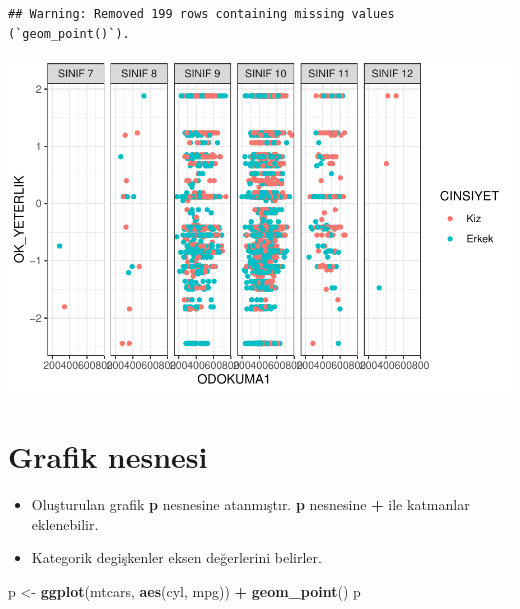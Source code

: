 \documentclass[
  oneside]{book}
\newenvironment{Shaded}{\begin{snugshade}}{\end{snugshade}}
\newcommand{\FunctionTok}[1]{\textcolor[rgb]{0.13,0.29,0.53}{\textbf{#1}}}
\newcommand{\NormalTok}[1]{#1}
\newcommand{\OtherTok}[1]{\textcolor[rgb]{0.56,0.35,0.01}{#1}}
\newcommand{\SpecialCharTok}[1]{\textcolor[rgb]{0.81,0.36,0.00}{\textbf{#1}}}
\providecommand{\tightlist}{%
  \setlength{\itemsep}{0pt}\setlength{\parskip}{0pt}}
\begin{document}
\begin{verbatim}
## Warning: Removed 199 rows containing missing values (`geom_point()`).
\end{verbatim}

\begin{center}\includegraphics[width=1\linewidth]{15-betimleyici-istatistik_files/figure-latex/unnamed-chunk-37-1} \end{center}

\hypertarget{grafik-nesnesi}{%
\section{Grafik nesnesi}\label{grafik-nesnesi}}

\begin{itemize}
\tightlist
\item
  Oluşturulan grafik \textbf{p} nesnesine atanmıştır. \textbf{p} nesnesine \textbf{+} ile katmanlar eklenebilir.
\item
  Kategorik degişkenler eksen değerlerini belirler.
\end{itemize}

\begin{Shaded}
\begin{Highlighting}[]
\NormalTok{p }\OtherTok{\textless{}{-}} \FunctionTok{ggplot}\NormalTok{(mtcars, }\FunctionTok{aes}\NormalTok{(cyl, mpg)) }\SpecialCharTok{+}
  \FunctionTok{geom\_point}\NormalTok{()}
\NormalTok{p}
\end{Highlighting}
\end{Shaded}
\end{document}
